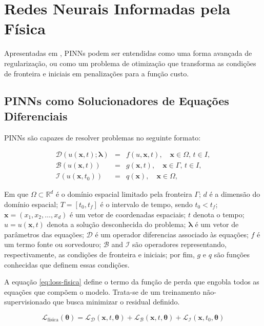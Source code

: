 \section{Redes Neurais Informadas pela Física}

Apresentadas em \cite{raissi-etal:19}, PINNs podem ser entendidas como uma forma
avançada de regularização, ou como um problema de otimização que transforma 
as condições de fronteira e iniciais em penalizações para a função custo. 

\subsection{PINNs como Solucionadores de Equações Diferenciais}

PINNs são capazes de resolver problemas no seguinte formato: 

\begin{eqnarray}
    \mathcal{D}(u(\boldsymbol{x},t);\boldsymbol{\lambda}) &=& f(u,\boldsymbol{x},t), \quad \boldsymbol{x} \in \Omega, \, t \in I, \label{model-1-a}\\
    \mathcal{B}(u(\boldsymbol{x},t)) &=& g(\boldsymbol{x},t), \quad \boldsymbol{x} \in \Gamma, \, t \in I, \label{model-1-b}\\
    \mathcal{I}(u(\boldsymbol{x},t_0)) &=& q(\boldsymbol{x}), \quad \boldsymbol{x} \in \Omega, \label{model-1-c}
\end{eqnarray}

Em que $\Omega \subset \mathbb{R}^d$ é o domínio espacial limitado pela 
fronteira $\Gamma$; 
$d$ é a dimensão do domínio espacial; 
$T = [t_0, t_f]$ é o intervalo de tempo, sendo $t_0 < t_f$; 
$\boldsymbol{x} = (x_1, x_2, \dots, x_d)$ é um vetor de coordenadas espaciais; 
$t$ denota o tempo; 
$u = u(\boldsymbol{x}, t)$ denota a solução desconhecida do problema; 
$\boldsymbol{\lambda}$ é um vetor de parâmetros das equações; 
$\mathcal{D}$ é um operador diferencias associado às equações; 
$f$ é um termo fonte ou sorvedouro; 
$\mathcal{B}$ and $\mathcal{I}$ são operadores representando, respectivamente,
as condições de fronteira e iniciais; 
por fim, $g$ e $q$ são funções conhecidas que definem essas condições.

A equação \ref{eq:loss-fisica} define o termo da função de perda que engobla
todos as equações que compõem o modelo. Trata-se de um treinamento 
não-supervisionado que busca minimizar o residual definido.

\begin{equation}\label{eq:loss-fisica}
    \mathcal{L}_{\text{física}}(\boldsymbol{\theta}) 
    = \mathcal{L}_{\mathcal{D}}(\boldsymbol{x},t,\boldsymbol{\theta}) 
    + \mathcal{L}_{\mathcal{B}}(\boldsymbol{x},t,\boldsymbol{\theta}) 
    + \mathcal{L}_{\mathcal{I}}(\boldsymbol{x},t_0,\boldsymbol{\theta}) 
\end{equation}

